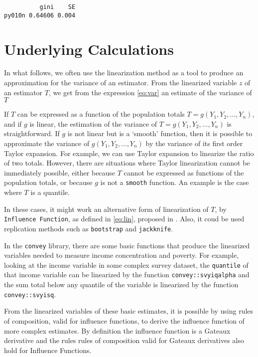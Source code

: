 \documentclass[]{book}
\theoremstyle{definition}
\theoremstyle{definition}
\theoremstyle{remark}
\begin{document}
\begin{verbatim}
          gini    SE
py010n 0.64606 0.004
\end{verbatim}

\section{Underlying Calculations}\label{underlying-calculations}

In what follows, we often use the linearization method as a tool to
produce an approximation for the variance of an estimator. From the
linearized variable \(z\) of an estimator \(T\), we get from the
expression \eqref{eq:var} an estimate of the variance of \(T\)

If \(T\) can be expressed as a function of the population totals
\(T = g(Y_1, Y_2, \ldots, Y_n)\), and if \(g\) is linear, the estimation
of the variance of \(T = g(Y_1, Y_2, \ldots, Y_n)\) is straightforward.
If \(g\) is not linear but is a `smooth' function, then it is possible
to approximate the variance of \(g(Y_1, Y_2, \ldots, Y_n)\) by the
variance of its first order Taylor expansion. For example, we can use
Taylor expansion to linearize the ratio of two totals. However, there
are situations where Taylor linearization cannot be immediately
possible, either because \(T\) cannot be expressed as functions of the
population totals, or because \(g\) is not a \texttt{smooth} function.
An example is the case where \(T\) is a quantile.

In these cases, it might work an alternative form of linearization of
\(T\), by \texttt{Influence\ Function}, as defined in \eqref{eq:lin},
proposed in \citep{deville1999}. Also, it coud be used replication
methods such as \texttt{bootstrap} and \texttt{jackknife}.

In the \texttt{convey} library, there are some basic functions that
produce the linearized variables needed to measure income concentration
and poverty. For example, looking at the income variable in some complex
survey dataset, the \texttt{quantile} of that income variable can be
linearized by the function \texttt{convey::svyiqalpha} and the sum total
below any quantile of the variable is linearized by the function
\texttt{convey::svyisq}.

From the linearized variables of these basic estimates, it is possible
by using rules of composition, valid for influence functions, to derive
the influence function of more complex estimates. By definition the
influence function is a Gateaux derivative and the rules rules of
composition valid for Gateaux derivatives also hold for Influence
Functions.
\end{document}
